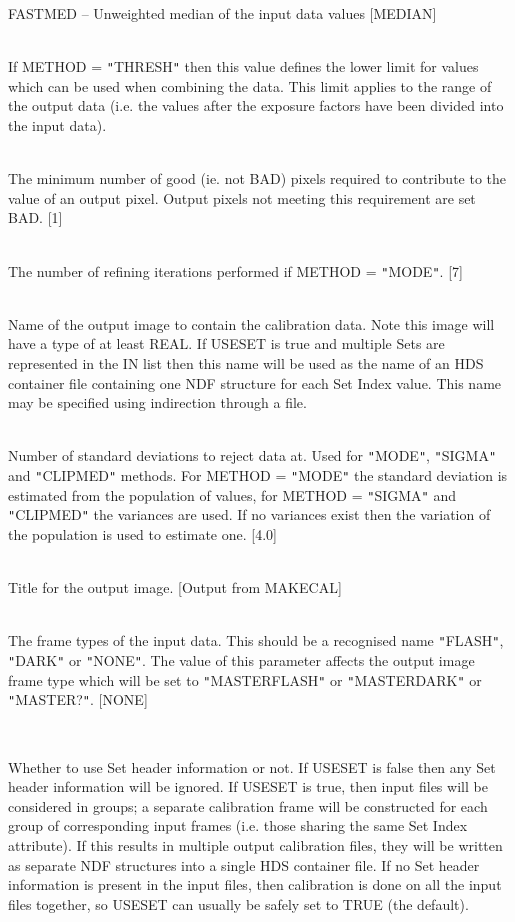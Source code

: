 \documentclass[twoside,11pt]{article}
\renewcommand{\_}{\texttt{\symbol{95}}}
\newcommand{\qt}[1]{{\tt "}#1{\tt "}}
\newcommand{\sstsubsection}[1]{ \item[{#1}] \mbox{} \\}
\newcommand{\sstitem}{\item}
\newcommand{\sstsubsection}[1]{\item[{#1}]}
\newcommand{\sstitem}{\item}
\begin{document}
{{{{            \sstitem
               FASTMED   -- Unweighted median of the input data values
            [MEDIAN]
         }
      }
      \sstsubsection{
         MIN = \_REAL (Read)
      } {
         If METHOD = \qt{THRESH} then this value defines the lower limit
         for values which can be used when combining the data. This
         limit applies to the range of the output data (i.e. the values
         after the exposure factors have been divided into the input
         data).
      }
      \sstsubsection{
         MINPIX = \_INTEGER (Read)
      } {
         The minimum number of good (ie. not BAD) pixels required
         to contribute to the value of an output pixel. Output pixels
         not meeting this requirement are set BAD.
         [1]
      }
      \sstsubsection{
         NITER = \_INTEGER (Read)
      } {
         The number of refining iterations performed if METHOD = \qt{MODE}.
         [7]
      }
      \sstsubsection{
         OUT = LITERAL (Write)
      } {
         Name of the output image to contain the calibration data.
         Note this image will have a type of at least \_REAL.
         If USESET is true and multiple Sets are represented in the IN
         list then this name will be used as the name of an HDS
         container file containing one NDF structure for each Set Index value.
         This name may be specified using indirection through a file.
      }
      \sstsubsection{
         SIGMAS = \_REAL (Read)
      } {
         Number of standard deviations to reject data at. Used for
         \qt{MODE}, \qt{SIGMA} and \qt{CLIPMED} methods. For METHOD =
         \qt{MODE} the standard deviation is estimated from the
         population of values, for METHOD = \qt{SIGMA} and
         \qt{CLIPMED} the variances
         are used. If no variances exist then the variation of the
         population is used to estimate one.
         [4.0]
      }
      \sstsubsection{
         TITLE = LITERAL (Read)
      } {
         Title for the output image.
         [Output from MAKECAL]
      }
      \sstsubsection{
         TYPE = LITERAL (Read)
      } {
         The frame types of the input data. This should be a recognised
         name \qt{FLASH}, \qt{DARK} or \qt{NONE}. The value of this parameter
         affects the output image frame type which will be set to
         \qt{MASTER\_FLASH} or \qt{MASTER\_DARK} or \qt{MASTER\_?}.
         [NONE]
      }
      \sstsubsection{
         USESET = \_LOGICAL (Read)
      } {
         Whether to use Set header information or not.  If USESET is
         false then any Set header information will be ignored.
         If USESET is true, then input files will be considered in
         groups; a separate calibration frame will be constructed 
         for each group of corresponding input frames (i.e. those
         sharing the same Set Index attribute).  If this results in 
         multiple output calibration files, they will be written as 
         separate NDF structures into a single HDS container file.
         If no Set header information is present in the input files, 
         then calibration is done on all the input files together,
         so USESET can usually be safely set to TRUE (the default).

}}}
\end{document}
